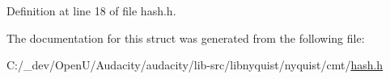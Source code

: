 Definition at line 18 of file hash.\+h.



The documentation for this struct was generated from the following file\+:\begin{DoxyCompactItemize}
\item 
C\+:/\+\_\+dev/\+Open\+U/\+Audacity/audacity/lib-\/src/libnyquist/nyquist/cmt/\hyperlink{libnyquist_2nyquist_2cmt_2hash_8h}{hash.\+h}\end{DoxyCompactItemize}
